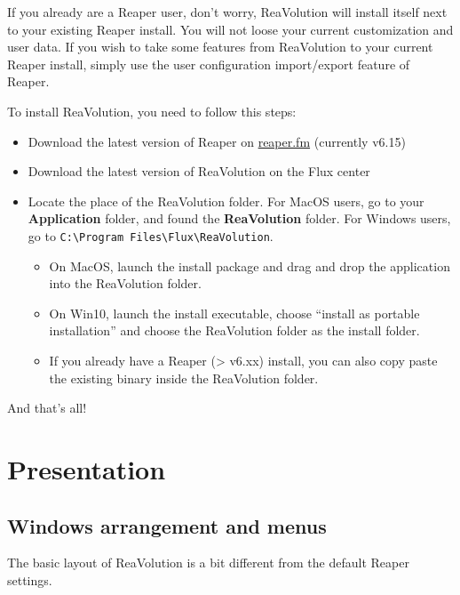 \documentclass[
  letterpaper,
  DIV=11,
  numbers=noendperiod]{scrreport}
\providecommand{\tightlist}{%
  \setlength{\itemsep}{0pt}\setlength{\parskip}{0pt}}\usepackage{longtable,booktabs,array}
\begin{document}
If you already are a Reaper user, don't worry, ReaVolution will install
itself next to your existing Reaper install. You will not loose your
current customization and user data. If you wish to take some features
from ReaVolution to your current Reaper install, simply use the user
configuration import/export feature of Reaper.

To install ReaVolution, you need to follow this steps:

\begin{itemize}
\item
  Download the latest version of Reaper on
  \href{http://reaper.fm}{reaper.fm} (currently v6.15)
\item
  Download the latest version of ReaVolution on the Flux center
\item
  Locate the place of the ReaVolution folder. For MacOS users, go to
  your \textbf{Application} folder, and found the \textbf{ReaVolution}
  folder. For Windows users, go to
  \texttt{C:\textbackslash{}Program\ Files\textbackslash{}Flux\textbackslash{}ReaVolution}.

  \begin{itemize}
  \tightlist
  \item
    On MacOS, launch the install package and drag and drop the
    application into the ReaVolution folder.
  \item
    On Win10, launch the install executable, choose ``install as
    portable installation'' and choose the ReaVolution folder as the
    install folder.
  \item
    If you already have a Reaper (\textgreater{} v6.xx) install, you can
    also copy paste the existing binary inside the ReaVolution folder.
  \end{itemize}
\end{itemize}

And that's all!

\hypertarget{presentation}{%
\section{Presentation}\label{presentation}}

\hypertarget{windows-arrangement-and-menus}{%
\subsection{Windows arrangement and
menus}\label{windows-arrangement-and-menus}}

The basic layout of ReaVolution is a bit different from the default
Reaper settings.
\end{document}
